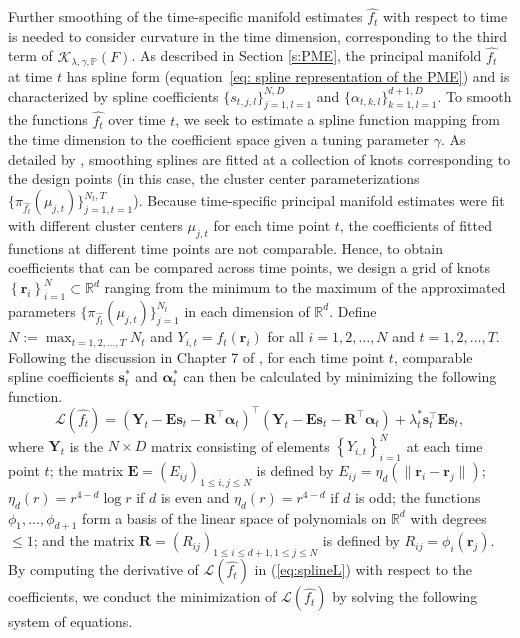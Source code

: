 \documentclass[12pt]{article}
\newcommand{\T}{\intercal}
\theoremstyle{definition}
\begin{document}
Further smoothing of the time-specific manifold estimates $\widehat{f_t}$ with respect to time is needed to consider curvature in the time dimension, corresponding to the third term of $\mathcal{K}_{\lambda, \gamma, \mathbb{P}}(F)$. As described in Section \ref{s:PME}, the principal manifold $\widehat{f_t}$ at time $t$ has spline form (equation~\eqref{eq: spline representation of the PME}) and is characterized by spline coefficients $\{s_{t, j, l}\}_{j=1, l=1}^{N, D}$ and $\{\alpha_{t, k, l}\}_{k=1, l=1}^{d+1, D}$. To smooth the functions $\widehat{f_t}$ over time $t$, we seek to estimate a spline function mapping from the time dimension to the coefficient space given a tuning parameter $\gamma$. As detailed by \cite{greenSilverman1994}, smoothing splines are fitted at a collection of knots corresponding to the design points (in this case, the cluster center parameterizations $\{\pi_{\widehat{f_t}}(\mu_{j, t})\}_{j=1, t=1}^{N_t, T}$). Because time-specific principal manifold estimates were fit with different cluster centers $\mu_{j, t}$ for each time point $t$, the coefficients of fitted functions at different time points are not comparable. Hence, to obtain coefficients that can be compared across time points, we design a grid of knots $\left\{\mathbf{r}_i\right\}_{i=1}^{N} \subset \mathbb{R}^d$ ranging from the minimum to the maximum of the approximated parameters $\{\pi_{\widehat{f_t}}(\mu_{j, t})\}_{j=1}^{N_t}$ in each dimension of $\mathbb{R}^d$. Define $N:=\max_{t=1,2,\ldots,T} N_t$ and $Y_{i,t}=\widehat{f_t}(\mathbf{r}_i)$ for all $i=1,2,\ldots,N$ and $t=1,2,\ldots,T$. Following the discussion in Chapter 7 of \cite{greenSilverman1994}, for each time point $t$, comparable spline coefficients $\mathbf{s}_t^*$ and $\mathbf{\alpha}_t^*$ can then be calculated by minimizing the following function.
\begin{equation}\label{eq:splineL}
    \mathcal{L}(\widehat{f_t}) = (\mathbf{Y}_t - \mathbf{E}\mathbf{s}_t - \mathbf{R}^\T\mathbf{\alpha}_t)^\T(\mathbf{Y}_t - \mathbf{E}\mathbf{s}_t - \mathbf{R}^\T\mathbf{\alpha}_t) + \lambda_t^*\mathbf{s}_t^\T \mathbf{E}\mathbf{s}_t,
\end{equation}
where $\mathbf{Y}_t$ is the $N \times D$ matrix consisting of elements $\left\{Y_{i,t}\right\}_{i=1}^{N}$ at each time point $t$; the matrix $\mathbf{E}=(E_{ij})_{1\le i,j\le N}$ is defined by $E_{ij} = \eta_{d}(\|\mathbf{r}_i - \mathbf{r}_j\|)$; $\eta_{d}(r) = r^{4 - d}\log r$ if $d$ is even and $\eta_d(r) = r^{4-d}$ if $d$ is odd; the functions $\phi_1,\ldots,\phi_{d+1}$ form a basis of the linear space of polynomials on $\mathbb{R}^d$ with degrees $\le1$; and the matrix $\mathbf{R}=(R_{ij})_{1\le i\le d+1,1\le j\le N}$ is defined by $R_{ij} = \phi_i(\mathbf{r}_j)$. By computing the derivative of $\mathcal{L}(\widehat{f_t})$ in (\ref{eq:splineL}) with respect to the coefficients, we conduct the minimization of $\mathcal{L}(\widehat{f_t})$ by solving the following system of equations.
\end{document}
